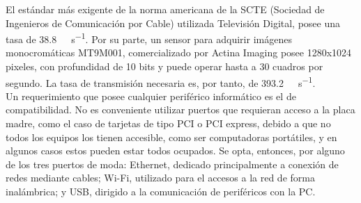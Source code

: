 


El estándar más exigente de la norma americana de la SCTE (Sociedad de Ingenieros de Comunicación por Cable) utilizada Televisión Digital, posee una tasa de \SI{38.8}{\mega\bit\per\second}\cite{SocietyofCableTelecommuniocationsEngineers2006}. Por su parte, un sensor para adquirir imágenes monocromáticas MT9M001, comercializado por Actina Imaging posee 1280x1024 pixeles, con profundidad de 10 bits y puede operar hasta a 30 cuadros por segundo\cite{MicronTechnology2004}. La tasa de transmisión necesaria es, por tanto, de \SI{393.2}{\mega\bit\per\second}.\\

Un requerimiento que posee cualquier periférico informático es el de compatibilidad. No es conveniente utilizar puertos que requieran acceso a la placa madre, como el caso de tarjetas de tipo PCI o PCI express, debido a que no todos los equipos los tienen accesible, como ser computadoras portátiles, y en algunos casos estos pueden estar todos ocupados. Se opta, entonces, por alguno de los tres puertos de moda: Ethernet, dedicado principalmente a conexión de redes mediante cables; Wi-Fi, utilizado para el accesos a la red de forma inalámbrica; y USB, dirigido a la comunicación de periféricos con la PC.\\

